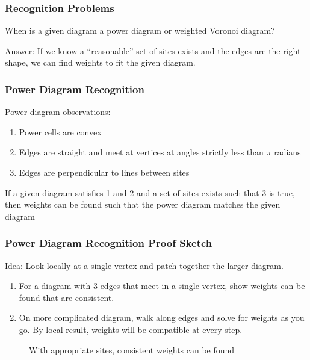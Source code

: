 \documentclass{beamer}
\begin{document}
\begin{frame}
  \frametitle{Recognition Problems}

  When is a given diagram a power diagram or weighted Voronoi diagram?

  \vspace{1cm}

  Answer: If we know a ``reasonable'' set of sites exists and the edges are the right shape, we can find weights to fit the given diagram.

\end{frame}

\begin{frame}
  \frametitle{Power Diagram Recognition}

  Power diagram observations:
  \begin{enumerate}
    \item Power cells are convex
    \item Edges are straight and meet at vertices at angles strictly less than $\pi$ radians
    \item Edges are perpendicular to lines between sites
  \end{enumerate}

  If a given diagram satisfies 1 and 2 and a set of sites exists such that 3 is true, then weights can be found such that the power diagram matches
  the given diagram \cite{ash-bolker}

\end{frame}

\begin{frame}
  \frametitle{Power Diagram Recognition Proof Sketch}

  Idea: Look locally at a single vertex and patch together the larger diagram.

  \begin{enumerate}
    \item For a diagram with 3 edges that meet in a single vertex, show weights can be found that are consistent.
    \item On more complicated diagram, walk along edges and solve for weights as you go. By local result, weights will be compatible at every step.
  \end{enumerate}

  \begin{figure}
    \caption{With appropriate sites, consistent weights can be found}
  \end{figure}

\end{frame}
\end{document}
